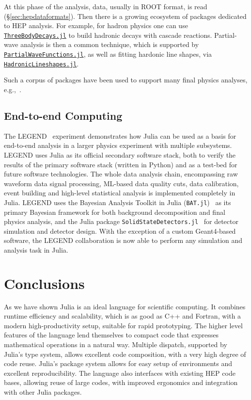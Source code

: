 \documentclass{webofc}
\begin{document}
At this phase of the analysis, data, usually in ROOT format, is read
(\S\ref{sec:hepdataformats}). Then there is a growing ecosystem of packages
dedicated to HEP analysis. For example, for hadron physics one can use
\href{https://github.com/mmikhasenko/ThreeBodyDecays.jl}{\texttt{ThreeBodyDecays.jl}}
to build hadronic decays with cascade reactions. Partial-wave analysis is then a
common technique, which is supported by
\href{https://github.com/mmikhasenko/PartialWaveFunctions.jl}{\texttt{PartialWaveFunctions.jl}},
as well as fitting hardonic line shapes, via
\href{https://github.com/mmikhasenko/HadronicLineshapes.jl}{\texttt{HadronicLineshapes.jl}}.

Such a corpus of packages have been used to support many final physics
analyses, e.g.,~\cite{Aaij2022,PhysRevD.104.L091102,Bibrzycki2021}.

\subsection{End-to-end Computing}
\label{sec:e2dlegend}

The LEGEND~\cite{LEGEND:2017AIPC} experiment demonstrates how Julia can be used
as a basis for end-to-end analysis in a larger physics experiment with multiple
subsystems. LEGEND uses Julia as its official secondary software stack, both to
verify the results of the primary software stack (written in Python) and as a
test-bed for future software technologies. The whole data analysis chain,
encompassing raw waveform data signal processing, ML-based data quality cuts,
data calibration, event building and high-level statistical analysis is
implemented completely in Julia. LEGEND uses the Bayesian Analysis
Toolkit in Julia (\texttt{BAT.jl})~\cite{Schulz:2021BAT} as its primary Bayesian
framework for both background decomposition and final physics analysis, and the
Julia package \texttt{SolidStateDetectors.jl}~\cite{Abt:2021SSD} for detector simulation
and detector design. With the exception of a custom Geant4-based software, the
LEGEND collaboration is now able to perform any simulation and analysis task in
Julia.


\section{Conclusions}

As we have shown Julia is an ideal language for scientific computing. It
combines runtime efficiency and scalability, which is as good as C++ and
Fortran, with a modern high-productivity setup, suitable for rapid prototyping.
The higher level features of the language lend themselves to compact code that
expresses mathematical operations in a natural way. Multiple dispatch, supported
by Julia's type system, allows excellent code composition, with a very high
degree of code reuse. Julia's package system allows for easy setup of
environments and excellent reproducibility. The language also interfaces with
existing HEP code bases, allowing reuse of large codes, with improved ergonomics
and integration with other Julia packages.
\end{document}
